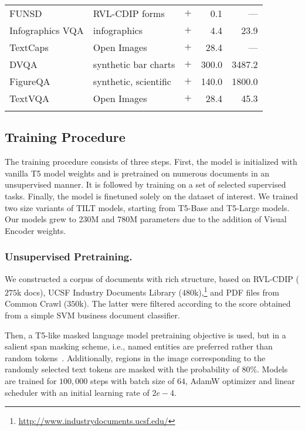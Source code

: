 \documentclass[runningheads]{llncs}
\begin{document}
\begin{table}[ht!]
\begin{tabular}{llcrr}
        FUNSD~\cite{jaume2019} & RVL-CDIP forms &  $+$ & 0.1 & --- \\

        Infographics VQA & infographics &  $+$ & 4.4 & 23.9 \\

        TextCaps~\cite{sidorov2019textcaps} & Open Images &  $+$ & 28.4 & --- \\

        DVQA~\cite{kafle2018dvqa} & synthetic bar charts &  $+$ & 300.0 & 3487.2 \\

        FigureQA~\cite{Kahou2018FigureQAAA} & synthetic, scientific &  $+$ & 140.0 & 1800.0 \\

        TextVQA~\cite{singh2019towards} & Open Images &  $+$ & 28.4 & 45.3 \\
        \bottomrule \\
    \end{tabular}
\end{table}

\subsection{Training Procedure}\label{sec:training_procedure}
The training procedure consists of three steps. First, the model is initialized with vanilla T5 model weights and is pretrained on numerous documents in an unsupervised manner. It is followed by training on a set of selected supervised tasks. Finally, the model is finetuned solely on the dataset of interest. We trained two size variants of TILT models, starting from T5-Base and T5-Large models. Our models grew to 230M and 780M parameters due to the addition of Visual Encoder weights.

\subsubsection{Unsupervised Pretraining.} We constructed a corpus of documents with rich structure, based on RVL-CDIP ($275$k docs), UCSF Industry Documents Library ($480$k),\footnote{\url{http://www.industrydocuments.ucsf.edu/}} and PDF files from Common Crawl ($350$k). The latter were filtered according to the score obtained from a simple SVM business document classifier.

Then, a T5-like masked language model pretraining objective is used, but in a salient span masking scheme, i.e., named entities are preferred rather than random tokens~\cite{2020t5,guu2020realm}.
Additionally, regions in the image corresponding to the randomly selected text tokens are masked with the probability of $80\%$. Models are trained for $100,000$ steps with batch size of $64$, AdamW optimizer and linear scheduler with an initial learning rate of $2e-4$.
\end{document}
